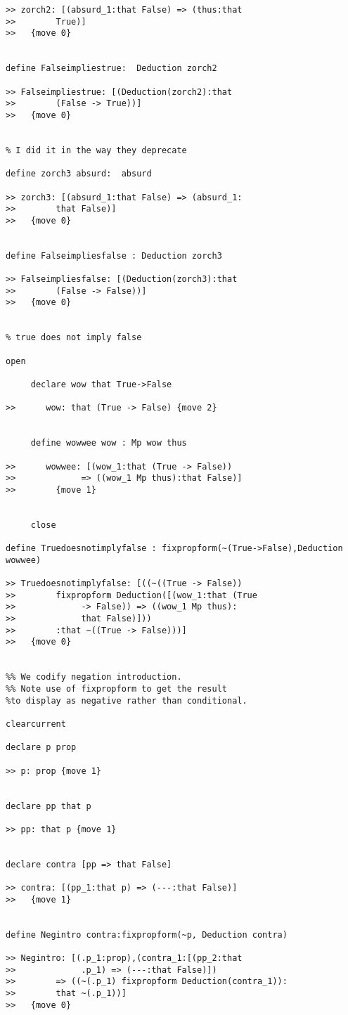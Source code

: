 \documentclass[12pt]{article}
\begin{document}
\begin{verbatim}
>> zorch2: [(absurd_1:that False) => (thus:that 
>>        True)]
>>   {move 0}


define Falseimpliestrue:  Deduction zorch2

>> Falseimpliestrue: [(Deduction(zorch2):that 
>>        (False -> True))]
>>   {move 0}


% I did it in the way they deprecate

define zorch3 absurd:  absurd

>> zorch3: [(absurd_1:that False) => (absurd_1:
>>        that False)]
>>   {move 0}


define Falseimpliesfalse : Deduction zorch3

>> Falseimpliesfalse: [(Deduction(zorch3):that 
>>        (False -> False))]
>>   {move 0}


% true does not imply false

open

     declare wow that True->False

>>      wow: that (True -> False) {move 2}


     define wowwee wow : Mp wow thus

>>      wowwee: [(wow_1:that (True -> False)) 
>>             => ((wow_1 Mp thus):that False)]
>>        {move 1}


     close

define Truedoesnotimplyfalse : fixpropform(~(True->False),Deduction wowwee)

>> Truedoesnotimplyfalse: [((~((True -> False)) 
>>        fixpropform Deduction([(wow_1:that (True 
>>             -> False)) => ((wow_1 Mp thus):
>>             that False)]))
>>        :that ~((True -> False)))]
>>   {move 0}


%% We codify negation introduction.
%% Note use of fixpropform to get the result 
%to display as negative rather than conditional.

clearcurrent

declare p prop

>> p: prop {move 1}


declare pp that p

>> pp: that p {move 1}


declare contra [pp => that False]

>> contra: [(pp_1:that p) => (---:that False)]
>>   {move 1}


define Negintro contra:fixpropform(~p, Deduction contra)

>> Negintro: [(.p_1:prop),(contra_1:[(pp_2:that 
>>             .p_1) => (---:that False)])
>>        => ((~(.p_1) fixpropform Deduction(contra_1)):
>>        that ~(.p_1))]
>>   {move 0}



\end{verbatim}
\end{document}
